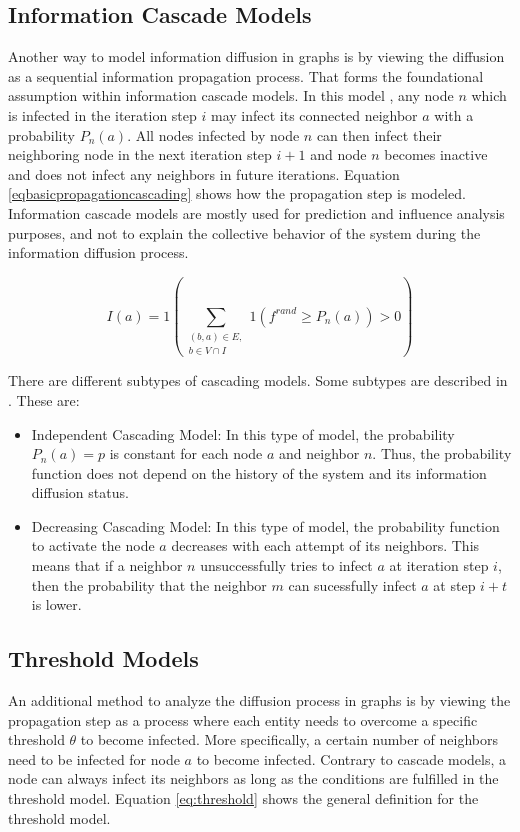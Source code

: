 \subsection{Information Cascade Models}

Another way to model information diffusion in graphs is by viewing the diffusion as a 
sequential information propagation process. That forms the foundational 
assumption within information cascade models. In this model 
\cite{reviewinformationdiffusion}, any node $n$ which is infected in the
iteration step $i$ may infect its connected neighbor $a$ with a 
probability $P_n(a)$. All nodes infected by node $n$
can then infect their neighboring node in the next iteration step $i+1$
and node $n$ becomes inactive and does not infect any neighbors in future
iterations.
Equation \ref{eqbasicpropagationcascading} 
shows how the propagation step is modeled.
Information cascade models are mostly used for prediction and influence 
analysis purposes, and not to explain the collective behavior
of the system during the information diffusion process.

\begin{equation}
    I(a) = 1 (\sum\limits_{\substack{(b,a)\in E, \\ b \in V \cap I}}
    1(f^{rand}\geq P_n(a))>0) 
    \label{eqbasicpropagationcascading}
\end{equation}

There are different subtypes of cascading models.
Some subtypes are described in \cite{diffusionbasics}. These are:

\begin{itemize}
    \item Independent Cascading Model: In this type of model, the 
    probability $P_n(a)=p$ is constant for each node $a$ and neighbor $n$.
    Thus, the probability function does not depend on the history 
    of the system and its information diffusion status.
    \item Decreasing Cascading Model: In this type of model, the probability
    function to activate the node $a$ decreases with each attempt of its 
    neighbors. This means that if a neighbor $n$ unsuccessfully tries to infect
    $a$ at iteration step $i$, then the probability that the neighbor $m$
    can sucessfully infect $a$ at step $i+t$ is lower.
\end{itemize}

\subsection{Threshold Models}
An additional method to analyze the diffusion process in graphs is by viewing the
propagation step as a process where each entity needs to overcome a 
specific threshold $\theta$ to become infected. More specifically, 
a certain number of neighbors need to be infected for node $a$ to become 
infected. Contrary to cascade models, a node can always 
infect its neighbors as long as the conditions are fulfilled in the threshold 
model. Equation \ref{eq:threshold} shows the general definition 
for the threshold model.

